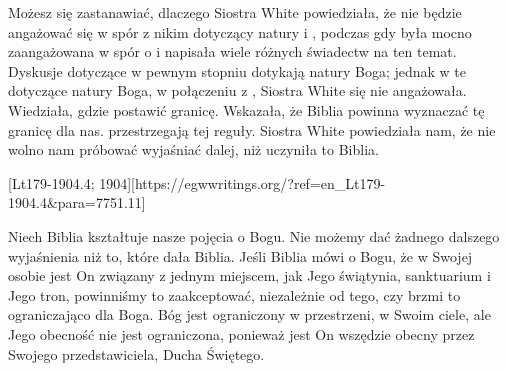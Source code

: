 Możesz się zastanawiać, dlaczego Siostra White powiedziała, że nie będzie angażować się w spór z nikim dotyczący natury i , podczas gdy była mocno zaangażowana w spór o  i napisała wiele różnych świadectw na ten temat. Dyskusje dotyczące  w pewnym stopniu dotykają natury Boga; jednak w te dotyczące natury Boga, w połączeniu z , Siostra White się nie angażowała. Wiedziała, gdzie postawić granicę. Wskazała, że Biblia powinna wyznaczać tę granicę dla nas.   przestrzegają tej reguły. Siostra White powiedziała nam, że nie wolno nam próbować wyjaśniać  dalej, niż uczyniła to Biblia.

[Lt179-1904.4; 1904][https://egwwritings.org/?ref=en\_Lt179-1904.4&para=7751.11]

Niech Biblia kształtuje nasze pojęcia o Bogu. Nie możemy dać żadnego dalszego wyjaśnienia  niż to, które dała Biblia. Jeśli Biblia mówi o Bogu, że w Swojej osobie jest On związany z jednym miejscem, jak Jego świątynia, sanktuarium i Jego tron, powinniśmy to zaakceptować, niezależnie od tego, czy brzmi to ograniczająco dla Boga. Bóg jest ograniczony w przestrzeni, w Swoim ciele, ale Jego obecność nie jest ograniczona, ponieważ jest On wszędzie obecny przez Swojego przedstawiciela, Ducha Świętego.

